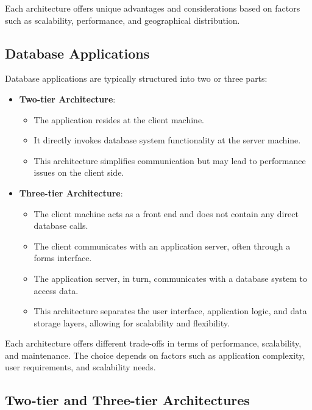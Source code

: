 \documentclass{article}
\begin{document}
Each architecture offers unique advantages and considerations based on factors such as scalability, performance, and geographical distribution.


\subsection*{Database Applications}

Database applications are typically structured into two or three parts:

\begin{itemize}
    \item \textbf{Two-tier Architecture}:
    \begin{itemize}
        \item The application resides at the client machine.
        \item It directly invokes database system functionality at the server machine.
        \item This architecture simplifies communication but may lead to performance issues on the client side.
    \end{itemize}
    
    \item \textbf{Three-tier Architecture}:
    \begin{itemize}
        \item The client machine acts as a front end and does not contain any direct database calls.
        \item The client communicates with an application server, often through a forms interface.
        \item The application server, in turn, communicates with a database system to access data.
        \item This architecture separates the user interface, application logic, and data storage layers, allowing for scalability and flexibility.
    \end{itemize}
\end{itemize}

Each architecture offers different trade-offs in terms of performance, scalability, and maintenance. The choice depends on factors such as application complexity, user requirements, and scalability needs.

\newpage

\subsection*{Two-tier and Three-tier Architectures}
\end{document}
